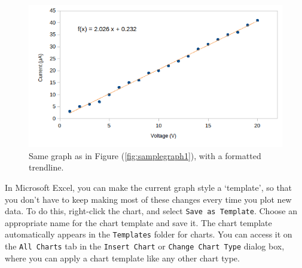 \begin{figure}[!htb]
    \centering
    \includegraphics[scale=0.8]{figs/samplegraph3.png}
    \caption{Same graph as in Figure (\ref{fig:samplegraph1}), with a formatted trendline.}
    \label{fig:samplegraph3}
\end{figure}

\begin{tip}
In Microsoft Excel, you can make the current graph style a `template', so that you don't have to keep making most of these changes every time you plot new data. To do this, right-click the chart, and select \texttt{Save as Template}. Choose an appropriate name for the chart template and save it. The chart template automatically appears in the \texttt{Templates} folder for charts. You can access it on the \texttt{All Charts} tab in the \texttt{Insert Chart} or \texttt{Change Chart Type} dialog box, where you can apply a chart template like any other chart type.
\end{tip}

%











\newpage